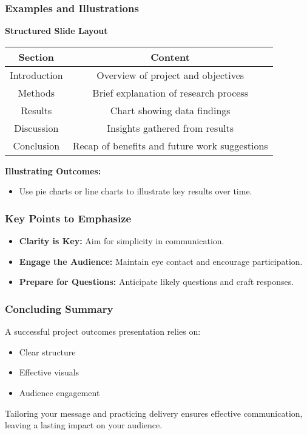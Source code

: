 \documentclass[aspectratio=169]{beamer}
\begin{document}
\begin{frame}[fragile]
    \frametitle{Examples and Illustrations}
    \textbf{Structured Slide Layout}
    \begin{table}[h]
        \centering
        \begin{tabular}{|c|c|}
            \hline
            \textbf{Section} & \textbf{Content} \\
            \hline
            Introduction & Overview of project and objectives \\
            Methods & Brief explanation of research process \\
            Results & Chart showing data findings \\
            Discussion & Insights gathered from results \\
            Conclusion & Recap of benefits and future work suggestions \\
            \hline
        \end{tabular}
    \end{table}

    \textbf{Illustrating Outcomes:}
    \begin{itemize}
        \item Use pie charts or line charts to illustrate key results over time.
    \end{itemize}
\end{frame}

\begin{frame}[fragile]
    \frametitle{Key Points to Emphasize}
    \begin{itemize}
        \item \textbf{Clarity is Key:} Aim for simplicity in communication.
        \item \textbf{Engage the Audience:} Maintain eye contact and encourage participation.
        \item \textbf{Prepare for Questions:} Anticipate likely questions and craft responses.
    \end{itemize}
\end{frame}

\begin{frame}[fragile]
    \frametitle{Concluding Summary}
    A successful project outcomes presentation relies on:
    \begin{itemize}
        \item Clear structure
        \item Effective visuals
        \item Audience engagement
    \end{itemize}
    Tailoring your message and practicing delivery ensures effective communication, leaving a lasting impact on your audience.
\end{frame}
\end{document}
